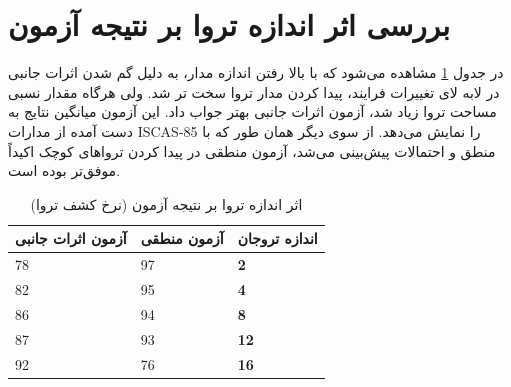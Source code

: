 \section{بررسی اثر اندازه تروا بر نتیجه آزمون}
در جدول \ref{tsize} مشاهده می‌شود که با بالا رفتن اندازه مدار، به دلیل گم شدن اثرات جانبی در لابه لای تغییرات فرایند، پیدا کردن مدار تروا سخت تر شد. ولی هرگاه مقدار نسبی مساحت تروا زیاد شد، آزمون اثرات جانبی بهتر جواب داد. این آزمون میانگین نتایج به دست آمده از مدارات ISCAS-85 را نمایش می‌دهد. از سوی دیگر همان طور که با منطق و احتمالات پیش‌بینی می‌شد، آزمون منطقی در پیدا کردن تروا‌های کوچک اکیداً موفق‌تر بوده است.
\begin{table}[t]
	\label{tsize}
	\begin{center}
		\begin{tabular}{| p{4cm} | p{4cm} |p{1cm}|}
			\hline
			\textbf{ آزمون اثرات جانبی} & \textbf{ آزمون منطقی} & \textbf{اندازه تروجان}\\ \hline \hline
			78 & 97 &\textbf{2} \\ \hline
			82 & 95 &\textbf{4} \\ \hline
			86 & 94 &\textbf{8} \\ \hline
			87 & 93 &\textbf{12} \\ \hline
			92 & 76 &\textbf{16} \\ \hline
		\end{tabular}
		\caption{
			اثر اندازه تروا بر نتیجه آزمون (نرخ کشف تروا)}
		
	\end{center}
\end{table}

